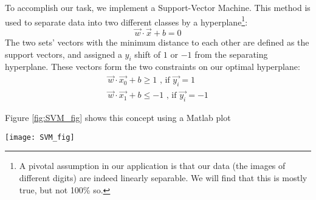 %
%

To accomplish our task, we implement a Support-Vector Machine. This method is used to separate data into two different classes by a hyperplane\footnote{A pivotal assumption in our application is that our data (the images of different digits) are indeed linearly separable. We will find that this is mostly true, but not 100\% so.}:
\begin{equation}
\vec{w}\cdot\vec{x} + b = 0
\end{equation}
The two sets' vectors with the minimum distance to each other are defined as the support vectors, and assigned a $y_{i}$ shift of $1$ or $-1$ from the separating hyperplane. These vectors form the two constraints on our optimal hyperplane:
\begin{equation}
\begin{gathered}
	\vec{w}\cdot\vec{x_0} + b \geq 1 \text{ , if } \vec{y_i} = 1 \\
	\vec{w}\cdot\vec{x_1} + b \leq -1 \text{ , if } \vec{y_i} = -1 
\end{gathered}
\end{equation}

Figure \ref{fig:SVM_fig} shows this concept using a Matlab plot

\begin{figure*}[!htb]
	\texttt{[image: SVM\_fig]}
	\centering
	\caption{The hyperplane is constrained to be within the limits of the margin, which are themselves defined by the support vectors. \cite{matlab}}
	\label{fig:SVM_fig}
\end{figure*}

